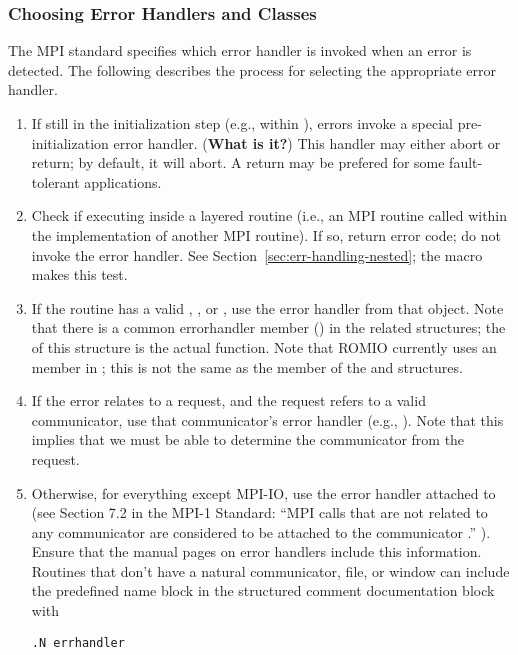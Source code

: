 \documentclass{article}
\begin{document}
\subsubsection{Choosing Error Handlers and Classes}
\label{sec:chosing-errhandler}

The MPI standard specifies which error handler is invoked when an error is
detected.  The following describes the process for selecting the appropriate
error handler.

\begin{enumerate}
\item If still in the initialization step (e.g., within
), errors invoke a special pre-initialization error
handler. (\textbf{What is it?})  This handler may either abort or
return; by default, it will abort. 
A return may be prefered for some fault-tolerant applications.

\item Check if executing inside a layered routine (i.e., an MPI routine called
  within the implementation of another MPI routine).  If so, return error
  code; do not invoke the error handler.  See
  Section~\ref{sec:err-handling-nested}; the  macro makes
  this test.

\item If the routine has a valid , , or
  , use the error handler from that object.  Note that there is
  a common errorhandler member () in the related structures;
  the  of this structure is the actual function.
  Note that ROMIO currently uses an  member
  in ; this is not the same as the  member
  of the  and  structures.

\item If the error relates to a request, and the request refers to a valid
  communicator, use that communicator's error handler (e.g., ).
  Note that this implies that we must be able to determine the communicator
  from the request.

\item Otherwise, for everything except MPI-IO, use the error handler attached
  to   
  (see Section 7.2 in the MPI-1 Standard: ``MPI calls that are not related to
  any communicator are considered to be attached to the communicator
  .'' ).  Ensure that the manual pages on error handlers
  include this information.  Routines that don't have a natural
communicator, file, or window can include the predefined name block
 in the structured comment documentation block with
\begin{verbatim}
.N errhandler
\end{verbatim}


\end{enumerate}
\end{document}
